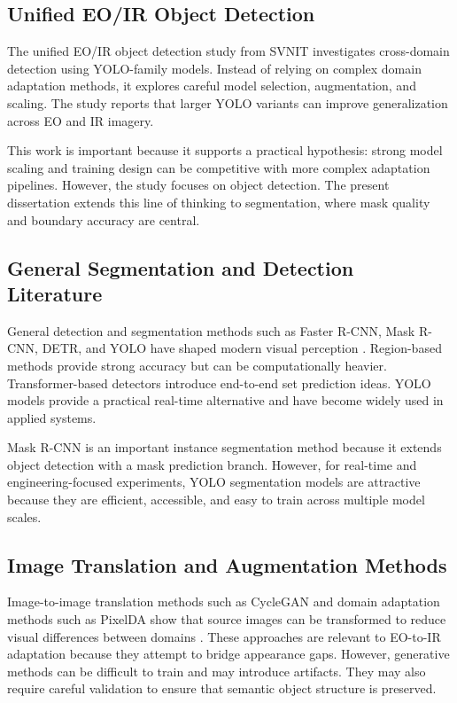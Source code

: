 \subsection{Unified EO/IR Object Detection}

The unified EO/IR object detection study from SVNIT investigates cross-domain detection using YOLO-family models. Instead of relying on complex domain adaptation methods, it explores careful model selection, augmentation, and scaling. The study reports that larger YOLO variants can improve generalization across EO and IR imagery.

This work is important because it supports a practical hypothesis: strong model scaling and training design can be competitive with more complex adaptation pipelines. However, the study focuses on object detection. The present dissertation extends this line of thinking to segmentation, where mask quality and boundary accuracy are central.

\subsection{General Segmentation and Detection Literature}

General detection and segmentation methods such as Faster R-CNN, Mask R-CNN, DETR, and YOLO have shaped modern visual perception \cite{fasterrcnn2015,maskrcnn2017,detr2020,yolo2016}. Region-based methods provide strong accuracy but can be computationally heavier. Transformer-based detectors introduce end-to-end set prediction ideas. YOLO models provide a practical real-time alternative and have become widely used in applied systems.

Mask R-CNN is an important instance segmentation method because it extends object detection with a mask prediction branch. However, for real-time and engineering-focused experiments, YOLO segmentation models are attractive because they are efficient, accessible, and easy to train across multiple model scales.

\subsection{Image Translation and Augmentation Methods}

Image-to-image translation methods such as CycleGAN and domain adaptation methods such as PixelDA show that source images can be transformed to reduce visual differences between domains \cite{cyclegan2017,pixelda2017}. These approaches are relevant to EO-to-IR adaptation because they attempt to bridge appearance gaps. However, generative methods can be difficult to train and may introduce artifacts. They may also require careful validation to ensure that semantic object structure is preserved.

